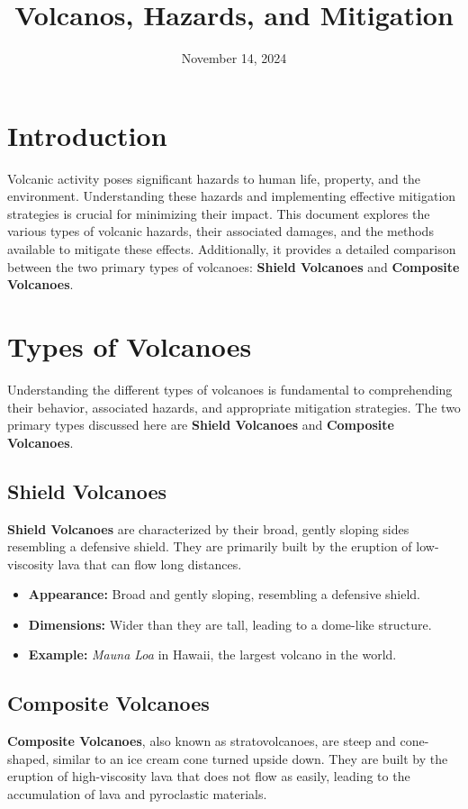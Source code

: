 \documentclass{article}
\begin{document}
\title{Volcanos, Hazards, and Mitigation}
\author{}
\date{November 14, 2024}

\maketitle

\section{Introduction}
Volcanic activity poses significant hazards to human life, property, and the environment. Understanding these hazards and implementing effective mitigation strategies is crucial for minimizing their impact. This document explores the various types of volcanic hazards, their associated damages, and the methods available to mitigate these effects. Additionally, it provides a detailed comparison between the two primary types of volcanoes: \textbf{Shield Volcanoes} and \textbf{Composite Volcanoes}.

\section{Types of Volcanoes}
Understanding the different types of volcanoes is fundamental to comprehending their behavior, associated hazards, and appropriate mitigation strategies. The two primary types discussed here are \textbf{Shield Volcanoes} and \textbf{Composite Volcanoes}.

\subsection{Shield Volcanoes}
\textbf{Shield Volcanoes} are characterized by their broad, gently sloping sides resembling a defensive shield. They are primarily built by the eruption of low-viscosity lava that can flow long distances.

\begin{itemize}[leftmargin=*, label={--}]
    \item \textbf{Appearance:} Broad and gently sloping, resembling a defensive shield.
    \item \textbf{Dimensions:} Wider than they are tall, leading to a dome-like structure.
    \item \textbf{Example:} \textit{Mauna Loa} in Hawaii, the largest volcano in the world.
\end{itemize}

\subsection{Composite Volcanoes}
\textbf{Composite Volcanoes}, also known as stratovolcanoes, are steep and cone-shaped, similar to an ice cream cone turned upside down. They are built by the eruption of high-viscosity lava that does not flow as easily, leading to the accumulation of lava and pyroclastic materials.
\end{document}
